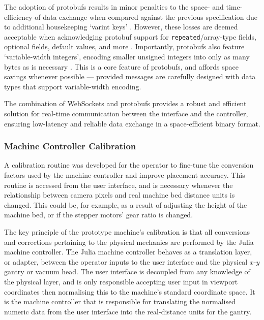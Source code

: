 \documentclass[12pt,british,UKenglish]{article}
\begin{document}
The adoption of \acp{protobuf} results in minor penalties to the space- and time-efficiency of data exchange when compared against the previous specification due to additional housekeeping `varint keys' \cite{protobufEncoding}.
However, these losses are deemed acceptable when acknowledging \acl{protobuf} support for \texttt{repeated}/array-type fields, optional fields, default values, and more \cite{protobufLanguageGuide}.
Importantly, \Aclp{protobuf} also feature `variable-width integers', encoding smaller unsigned integers into only as many bytes as is necessary \cite{5982183,protobufEncodingVarints}.
This is a core feature of \acp{protobuf}, and affords space savings whenever possible --- provided messages are carefully designed with data types that support variable-width encoding.

The combination of WebSockets and \aclp{protobuf} provides a robust and efficient solution for real-time communication between the interface and the controller, ensuring low-latency and reliable data exchange in a space-efficient binary format.

\subsubsection{Machine Controller Calibration}\label{sec:Calibration}

A calibration routine was developed for the operator to fine-tune the conversion factors used by the machine controller and improve placement accuracy.
This routine is accessed from the user interface, and is necessary whenever the relationship between camera pixels and real machine bed distance units is changed.
This could be, for example, as a result of adjusting the height of the machine bed, or if the stepper motors' gear ratio is changed.

The key principle of the prototype machine's calibration is that all conversions and corrections pertaining to the physical mechanics are performed by the Julia machine controller.
The Julia machine controller behaves as a translation layer, or adapter, between the operator inputs to the user interface and the physical $x$-$y$ gantry or vacuum head.
The user interface is decoupled from any knowledge of the physical layer, and is only responsible accepting user input in viewport coordinates then normalising this to the machine's standard coordinate space.
It is the machine controller that is responsible for translating the normalised numeric data from the user interface into the real-distance units for the gantry.
\end{document}
